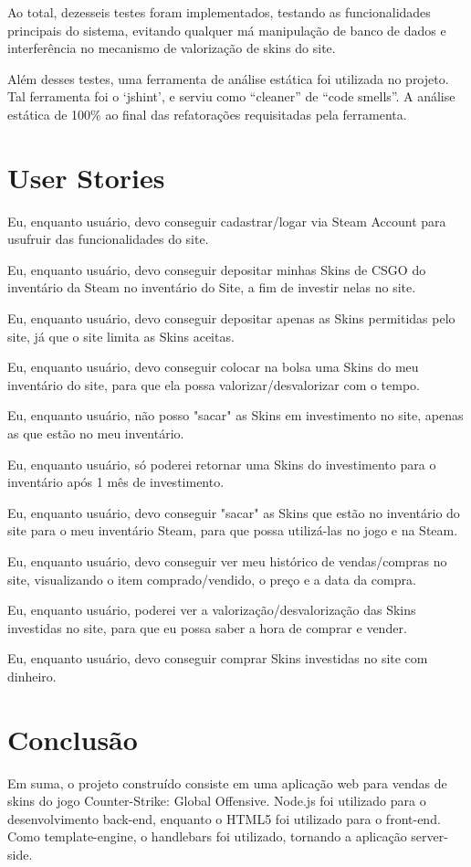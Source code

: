 \documentclass[a4paper,12pt]{article}
\begin{document}
    Ao total, dezesseis testes foram implementados, testando as funcionalidades principais do sistema, 
    evitando qualquer má manipulação de banco de dados e interferência no mecanismo de valorização de
     skins do site.
    
    Além desses testes, uma ferramenta de análise estática foi utilizada no projeto. Tal ferramenta 
    foi o ‘jshint’, e serviu como “cleaner” de “code smells”. A análise estática de 100\% ao final 
    das refatorações requisitadas pela ferramenta.

    \section{User Stories}
    Eu, enquanto usuário, devo conseguir cadastrar/logar via Steam Account para usufruir das 
    funcionalidades do site.

    Eu, enquanto usuário, devo conseguir depositar minhas Skins de CSGO do inventário da Steam no 
    inventário do Site, a fim de investir nelas no site.

    Eu, enquanto usuário, devo conseguir depositar apenas as Skins permitidas pelo site, já que o 
    site limita as Skins aceitas.

    Eu, enquanto usuário, devo conseguir colocar na bolsa uma Skins do meu inventário do site, para 
    que ela possa valorizar/desvalorizar com o tempo.

    Eu, enquanto usuário, não posso "sacar" as Skins em investimento no site, apenas as que estão no 
    meu inventário.

    Eu, enquanto usuário, só poderei retornar uma Skins do investimento para o inventário após 1 mês 
    de investimento.

    Eu, enquanto usuário, devo conseguir "sacar" as Skins que estão no inventário do site para o meu 
    inventário Steam, para que possa utilizá-las no jogo e na Steam.

    Eu, enquanto usuário, devo conseguir ver meu histórico de vendas/compras no site, visualizando o 
    item comprado/vendido, o preço e a data da compra.

    Eu, enquanto usuário, poderei ver a valorização/desvalorização das Skins investidas no site, para 
    que eu possa saber a hora de comprar e vender.

    Eu, enquanto usuário, devo conseguir comprar Skins investidas no site com dinheiro.

    \section{Conclusão}
    Em suma, o projeto construído consiste em uma aplicação web para vendas de skins do jogo 
    Counter-Strike: Global Offensive. Node.js foi utilizado para o desenvolvimento back-end, 
    enquanto o HTML5 foi utilizado para o front-end. Como template-engine, o handlebars foi utilizado, 
    tornando a aplicação server-side.
    
\end{document}
